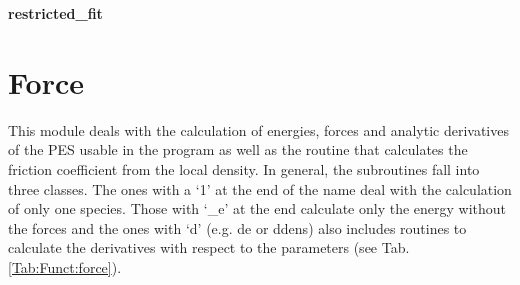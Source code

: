 \documentclass[twoside, 11pt, titlepage, captions=nooneline, a4paper, headsepline]{scrbook}%
\newcommand{\9}{\mathrm}
\newcommand{\0}{\,\mathrm}
\begin{document}
\textbf{restricted\_fit}\\

\section{Force}
This module deals with the calculation of energies, forces and analytic derivatives of the PES usable in the program as well as the routine that calculates the friction coefficient from the local density. In general, the subroutines fall into three classes. The ones with a `1' at the end of the name deal with the calculation of only one species. Those with `\_e' at the end calculate only the energy without the forces and the ones with `d' (e.g. de or ddens) also includes routines to calculate the derivatives with respect to the parameters (see Tab.\,\ref{Tab:Funct:force}).
\end{document}
